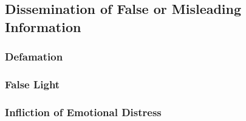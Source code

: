 
\subsection{Dissemination of False or Misleading Information}

\subsubsection{Defamation}


\subsubsection{False Light}


\subsubsection{Infliction of Emotional Distress}

